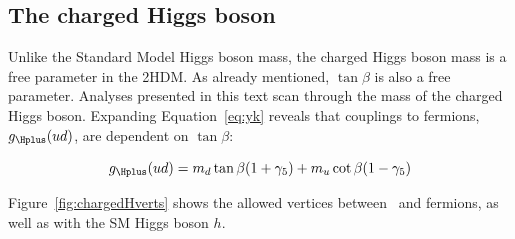 \subsection{The charged Higgs boson}
\label{sec:cHtheory}
\par Unlike the Standard Model Higgs boson mass, the charged Higgs boson mass is a free parameter 
in the 2HDM. As already mentioned, $\tan\beta$ is also a free parameter. Analyses presented in this 
text scan through the mass of the charged Higgs boson. Expanding Equation~\ref{eq:yk} reveals that 
couplings to fermions, $g_{\Hplus}(ud)$, are dependent on $\tan\beta$:

\begin{equation}
g_{\Hplus}(ud) = m_d\tan\beta(1+\gamma_5) + m_u\cot\beta(1-\gamma_5)
\end{equation} 

Figure~\ref{fig:chargedHverts} shows the allowed vertices between \Hplus\ and fermions, as 
well as with the SM Higgs boson $h$.  


